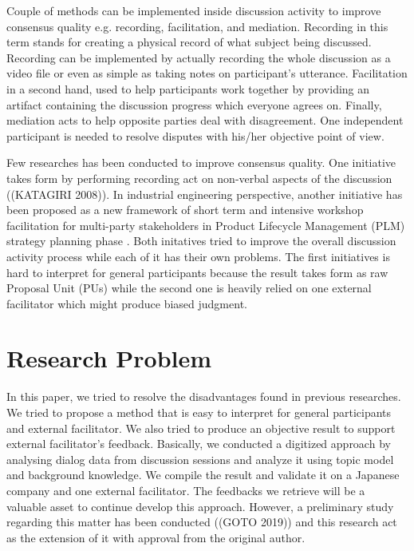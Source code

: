 \documentclass[conference]{IEEEtran}
\begin{document}
Couple of methods can be implemented inside discussion activity to improve consensus quality e.g. recording, facilitation, and mediation\cite{b1}. Recording in this term stands for creating a physical record of what subject being discussed. Recording can be implemented by actually recording the whole discussion as a video file or even as simple as taking notes on participant's utterance. Facilitation in a second hand, used to help participants work together by providing an artifact containing the discussion progress which everyone agrees on. Finally, mediation acts to help opposite parties deal with disagreement. One independent participant is needed to resolve disputes with his/her objective point of view.

Few researches has been conducted to improve consensus quality. One initiative takes form by performing recording act on non-verbal aspects of the discussion ((KATAGIRI 2008)). In industrial engineering perspective, another initiative has been proposed as a new framework of short term and intensive workshop facilitation for multi-party stakeholders in Product Lifecycle Management (PLM) strategy  planning phase \cite{b4}. Both initatives tried to improve the overall discussion activity process while each of it has their own problems. The first initiatives is hard to interpret for general participants because the result takes form as raw Proposal Unit (PUs) while the second one is heavily relied on one external facilitator which might produce biased judgment.

\section{Research Problem}
In this paper, we tried to resolve the disadvantages found in previous researches. We tried to propose a method that is easy to interpret for general participants and external facilitator. We also tried to produce an objective result to support external facilitator's feedback. Basically, we conducted a digitized approach by analysing dialog data from discussion sessions and analyze it using topic model and background knowledge. We compile the result and validate it on a Japanese company and one external facilitator. The feedbacks we retrieve will be a valuable asset to continue develop this approach. However, a preliminary study regarding this matter has been conducted ((GOTO 2019)) and this research act as the extension of it with approval from the original author.
\end{document}

